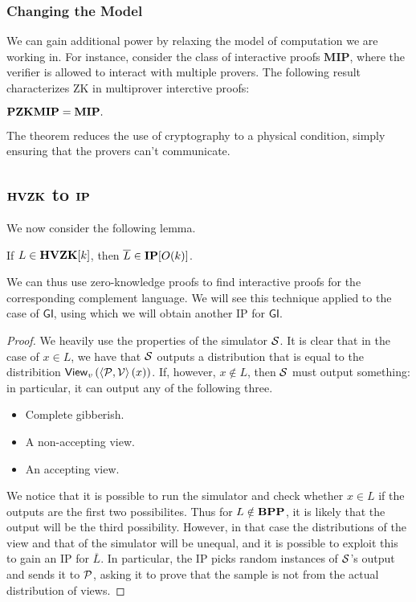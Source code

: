 \subsubsection{Changing the Model}

We can gain additional power by relaxing the model of computation we are working in. For instance, consider the class of interactive proofs $\mathbf{MIP}$, where the verifier is allowed to interact with multiple provers. The following result characterizes ZK in multiprover interctive proofs:

\begin{theorem}
	$\mathbf{PZK}\mathbf{MIP}=\mathbf{MIP}.$
\end{theorem}

The theorem reduces the use of cryptography to a physical condition, simply ensuring that the provers can't communicate.

\subsection{$\mathbf{HVZK}$ to $\mathbf{IP}$}

We now consider the following lemma.

\begin{lemma}
	If $L\in\mathbf{HVZK}[k]$, then $\overline{L}\in\mathbf{IP}[O(k)]$.
\end{lemma}

We can thus use zero-knowledge proofs to find interactive proofs for the corresponding complement language. We will see this technique applied to the case of $\mathsf{GI}$, using which we will obtain another IP for $\mathsf{GI}$.

\begin{proof}
	We heavily use the properties of the simulator $\mathcal{S}$. It is clear that in the case of $x\in L$, we have that $\mathcal{S}$ outputs a distribution that is equal to the distribition $\mathsf{View}_v\left(\left\langle\mathcal{P}, \mathcal{V}\right\rangle(x)\right)$. If, however, $x\notin L$, then $\mathcal{S}$ must output something: in particular, it can output any of the following three.
	\begin{itemize}
		\item Complete gibberish.
		\item A non-accepting view.
		\item An accepting view.
	\end{itemize}
	We notice that it is possible to run the simulator and check whether $x\in L$ if the outputs are the first two possibilites. Thus for $L\notin\mathbf{BPP}$, it is likely that the output will be the third possibility. However, in that case the distributions of the view and that of the simulator will be unequal, and it is possible to exploit this to gain an IP for $\overline{L}$. In particular, the IP picks random instances of $\mathcal{S}$'s output and sends it to $\mathcal{P}$, asking it to prove that the sample is not from the actual distribution of views.
\end{proof}

